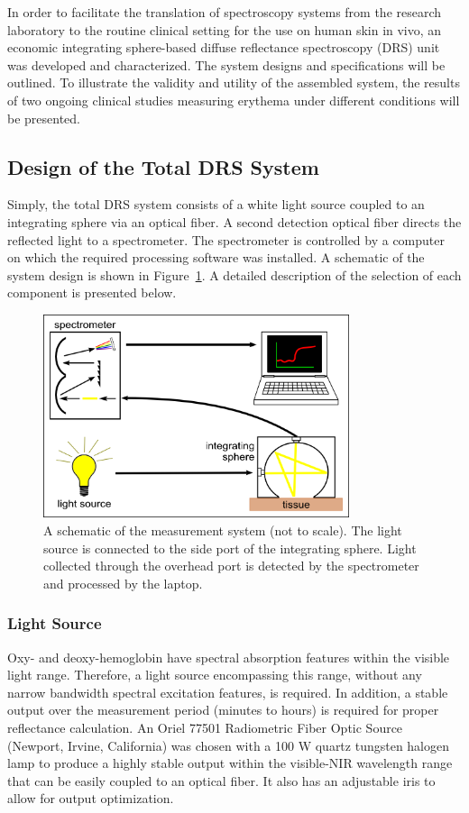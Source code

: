 In order to facilitate the translation of spectroscopy systems from the research laboratory to the routine clinical setting for the use on human skin in vivo, an economic integrating sphere-based diffuse reflectance spectroscopy (DRS) unit was developed and characterized. The system designs and specifications will be outlined. To illustrate the validity and utility of the assembled system, the results of two ongoing clinical studies measuring erythema under different conditions will be presented.

\subsection{Design of the Total DRS System}
Simply, the total DRS system consists of a white light source coupled to an integrating sphere via an optical fiber. A second detection optical fiber directs the reflected light to a spectrometer. The spectrometer is controlled by a computer on which the required processing software was installed. A schematic of the system design is shown in Figure~\ref{fig:p1-sys_diagram}. A detailed description of the selection of each component is presented below.

\begin{figure}
	\centering \includegraphics[width=0.8\textwidth]{figures/p1-sys_diagram.png}
	\caption[System schematic]{\label{fig:p1-sys_diagram}A schematic of the measurement system (not to scale). The light source is connected to the side port of the integrating sphere. Light collected through the overhead port is detected by the spectrometer and processed by the laptop.}
\end{figure}

\subsubsection{Light Source}
Oxy- and deoxy-hemoglobin have spectral absorption features within the visible light range.\cite{Young1997,Lister2012} Therefore, a light source encompassing this range, without any narrow bandwidth spectral excitation features, is required. In addition, a stable output over the measurement period (minutes to hours) is required for proper reflectance calculation. An Oriel 77501 Radiometric Fiber Optic Source (Newport, Irvine, California) was chosen with a 100 W quartz tungsten halogen lamp to produce a highly stable output within the visible-NIR wavelength range that can be easily coupled to an optical fiber. It also has an adjustable iris to allow for output optimization.

